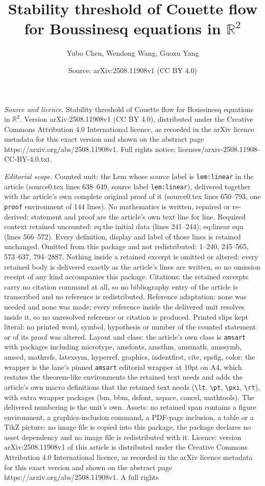 \documentclass[10pt,a4paper]{amsart}
\title[Stability threshold of Couette flow for Boussinesq equations]{Stability threshold of Couette flow for Boussinesq equations in $\mathbb{R}^2$}
\author{Yubo Chen, Wendong Wang, Guoxu Yang}
\date{Source: arXiv:2508.11908v1 (CC BY 4.0)}
\begin{document}
\maketitle

\noindent\emph{Source and licence.} Stability threshold of Couette flow for Boussinesq equations in $\mathbb{R}^2$. Version arXiv:2508.11908v1 (CC BY 4.0), distributed under the Creative Commons Attribution 4.0 International licence, as recorded in the arXiv licence metadata for this exact version and shown on the abstract page https://arxiv.org/abs/2508.11908v1. Full rights notice: licenses/arxiv-2508.11908-CC-BY-4.0.txt.\par\smallskip

\noindent\textit{Editorial scope.} Counted unit: the Lem whose source label is \texttt{lem:linear} in the article (source0.tex lines 638--649, source label \texttt{lem:linear}), delivered together with the article's own complete original proof of it (source0.tex lines 650--793, one \texttt{proof} environment of 144 lines). No mathematics is written, repaired or re-derived: statement and proof are the article's own text line for line. Required context retained uncounted: eq:the initial data (lines 241--244); eq:linear equ (lines 566--572). Every definition, display and label of those lines is retained unchanged. Omitted from this package and not redistributed: 1--240, 245--565, 573--637, 794--2887. Nothing inside a retained excerpt is omitted or altered: every retained body is delivered exactly as the article's lines are written, so no omission receipt of any kind accompanies this package. Citations: the retained excerpts carry no citation command at all, so no bibliography entry of the article is transcribed and no reference is redistributed. Reference adaptation: none was needed and none was made; every reference inside the delivered unit resolves inside it, so no unresolved reference or citation is produced. Printed slips kept literal: no printed word, symbol, hypothesis or number of the counted statement or of its proof was altered. Layout and class: the article's own class is \texttt{amsart} with packages including microtype, amsfonts, amsthm, amsmath, amssymb, amscd, mathrsfs, latexsym, hyperref, graphics, indentfirst, cite, epsfig, color; the wrapper is the lane's pinned \texttt{amsart} editorial wrapper at 10pt on A4, which restates the theorem-like environments the retained text needs and adds the article's own macro definitions that the retained text needs (\texttt{\textbackslash lt}, \texttt{\textbackslash pt}, \texttt{\textbackslash pxi}, \texttt{\textbackslash rt}), with extra wrapper packages (bm, bbm, dsfont, xspace, cancel, mathtools). The delivered numbering is the unit's own. Assets: no retained span contains a figure environment, a graphics-inclusion command, a PDF-page inclusion, a table or a TikZ picture; no image file is copied into this package, the package declares no asset dependency and no image file is redistributed with it. Licence: version arXiv:2508.11908v1 of this article is distributed under the Creative Commons Attribution 4.0 International licence, as recorded in the arXiv licence metadata for this exact version and shown on the abstract page https://arxiv.org/abs/2508.11908v1. A full rights 
\end{document}
